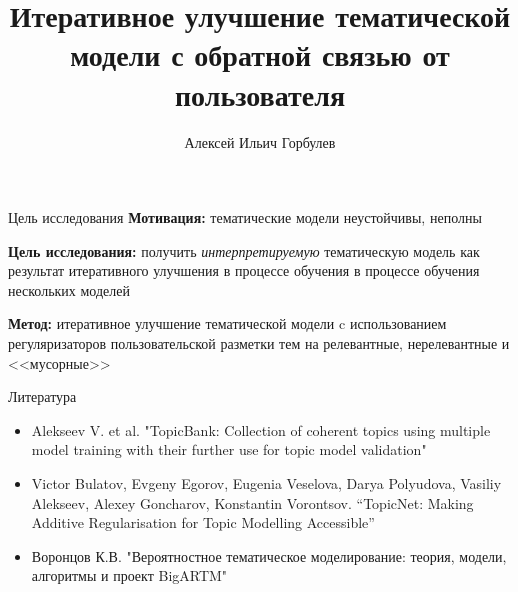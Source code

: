 \documentclass{beamer}
\title[\hbox to 56mm{Итеративное улучшение}]{Итеративное улучшение тематической \\ модели с обратной связью от пользователя}
\author[А.\,И. Горбулев]{Алексей Ильич Горбулев}
\institute{Московский физико-технический институт}
\date{\footnotesize
\par\smallskip\emph{Курс:} Моя первая научная статья/Группа Б05-021а
\par\smallskip\emph{Эксперт:} д. ф.-м. н. К.\,В.~Воронцов
\par\smallskip\emph{Консультант:} В.\,А.~Алексеев
\par\bigskip\small 4 мая 2023}
\begin{document}
\begin{frame}
\thispagestyle{empty}
\maketitle
\end{frame}

\begin{frame}{Цель исследования}
    \textbf{Мотивация:} тематические модели неустойчивы, неполны

    \textbf{Цель исследования:} получить \textit{интерпретируемую} тематическую модель как результат итеративного улучшения в процессе обучения в процессе обучения нескольких моделей

    \textbf{Метод:} итеративное улучшение тематической модели c использованием регуляризаторов пользовательской разметки тем на релевантные, нерелевантные и <<мусорные>>
\end{frame}

\begin{frame}{Литература}
\begin{itemize}
    \item Alekseev V. et al. "TopicBank: Collection of coherent topics using multiple model training with their further use for topic model validation"
    \item Victor Bulatov, Evgeny Egorov, Eugenia Veselova, Darya Polyudova, Vasiliy Alekseev, Alexey Goncharov, Konstantin Vorontsov. “TopicNet: Making Additive Regularisation for Topic Modelling Accessible”
    \item Воронцов К.В. "Вероятностное тематическое моделирование: теория, модели, алгоритмы и проект BigARTM"
\end{itemize}
\end{frame}
\end{document}
